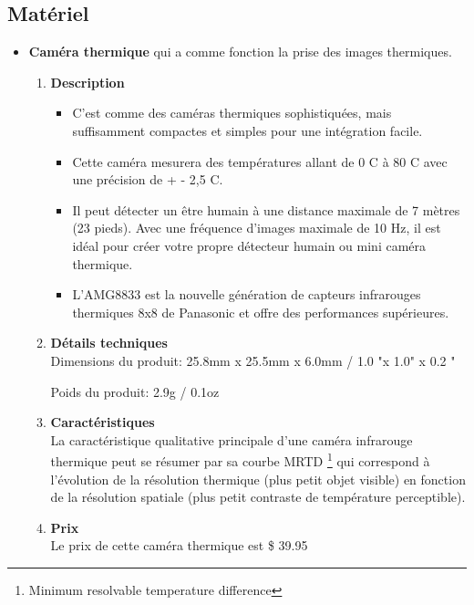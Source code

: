 \documentclass[12pt]{article}
\begin{document}
\subsection{Matériel}
\begin{itemize}
	\item \textbf{Caméra thermique} \cite{45} qui a comme fonction la prise des images thermiques.
	\begin{enumerate}
	\item \textbf{Description}\\
	\begin{itemize}
	\item C'est comme des caméras thermiques sophistiquées, mais suffisamment compactes et simples pour une intégration facile.
	\item Cette caméra mesurera des températures allant de 0 C\textdegree{} à 80 C\textdegree{} avec une précision de + - 2,5 C\textdegree{}. 
	\item Il peut détecter un être humain à une distance maximale de 7 mètres (23 pieds). Avec une fréquence d'images maximale de 10 Hz, il est idéal pour créer votre propre détecteur humain ou mini caméra thermique.
	\item L'AMG8833 est la nouvelle génération de capteurs infrarouges thermiques 8x8 de Panasonic et offre des performances supérieures.
	\end{itemize}

	\item \textbf{Détails techniques}\\
	Dimensions du produit: 25.8mm x 25.5mm x 6.0mm / 1.0 "x 1.0" x 0.2 "
	
	Poids du produit: 2.9g / 0.1oz
	\item \textbf{Caractéristiques}\\
	La caractéristique qualitative principale d’une caméra infrarouge thermique peut se résumer par sa courbe MRTD \footnote{Minimum resolvable temperature difference} qui correspond à l’évolution de la résolution thermique (plus petit objet visible) en fonction de la résolution spatiale (plus petit contraste de température perceptible).
	\item \textbf{Prix}\\
	Le prix de cette caméra thermique est  \$ 39.95  
\end{enumerate}	 


\end{itemize}
\end{document}
